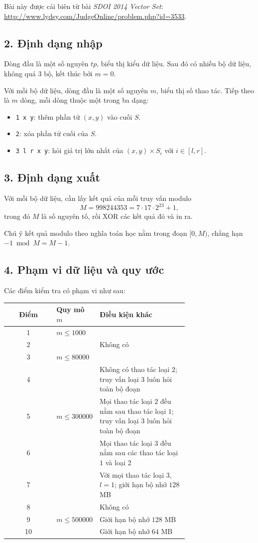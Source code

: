 \documentclass[11pt]{article}
\begin{document}
Bài này được cải biên từ bài \emph{SDOI 2014 Vector Set}:
\href{http://www.lydsy.com/JudgeOnline/problem.php?id=3533}{http://www.lydsy.com/JudgeOnline/problem.php?id=3533}.

\subsection*{2. Định dạng nhập}

Dòng đầu là một số nguyên \(tp\), biểu thị kiểu dữ liệu. Sau đó có nhiều bộ dữ
liệu, không quá \(3\) bộ, kết thúc bởi \(m=0\).

Với mỗi bộ dữ liệu, dòng đầu là một số nguyên \(m\), biểu thị số thao tác.
Tiếp theo là \(m\) dòng, mỗi dòng thuộc một trong ba dạng:
\begin{itemize}
  \item \texttt{1 x y}: thêm phần tử \((x,y)\) vào cuối \(S\).
  \item \texttt{2}: xóa phần tử cuối của \(S\).
  \item \texttt{3 l r x y}: hỏi giá trị lớn nhất của
  \((x,y)\times S_i\) với \(i\in[l,r]\).
\end{itemize}

\subsection*{3. Định dạng xuất}

Với mỗi bộ dữ liệu, cần lấy kết quả của mỗi truy vấn modulo
\[
  M=998244353=7\cdot 17\cdot 2^{23}+1,
\]
trong đó \(M\) là số nguyên tố, rồi XOR các kết quả đó và in ra.

Chú ý kết quả modulo theo nghĩa toán học nằm trong đoạn \([0,M)\), chẳng hạn
\(-1\bmod M=M-1\).

\subsection*{4. Phạm vi dữ liệu và quy ước}

Các điểm kiểm tra có phạm vi như sau:
\begin{center}
\small
\begin{tabular}{c p{0.23\linewidth} p{0.49\linewidth}}
\textbf{Điểm} & \textbf{Quy mô \(m\)} & \textbf{Điều kiện khác} \\
\hline
1 & \(m\le 1000\) & \\
2 & & Không có \\
3 & \(m\le 80000\) & \\
4 & & Không có thao tác loại \(2\); truy vấn loại \(3\) luôn hỏi toàn bộ đoạn \\
5 & \(m\le 300000\) & Mọi thao tác loại \(2\) đều nằm sau thao tác loại \(1\); truy vấn loại \(3\) luôn hỏi toàn bộ đoạn \\
6 & & Mọi thao tác loại \(3\) đều nằm sau các thao tác loại \(1\) và loại \(2\) \\
7 & & Với mọi thao tác loại \(3\), \(l=1\); giới hạn bộ nhớ \(128\) MB \\
8 & & Không có \\
9 & \(m\le 500000\) & Giới hạn bộ nhớ \(128\) MB \\
10 & & Giới hạn bộ nhớ \(64\) MB
\end{tabular}
\end{center}
\end{document}
